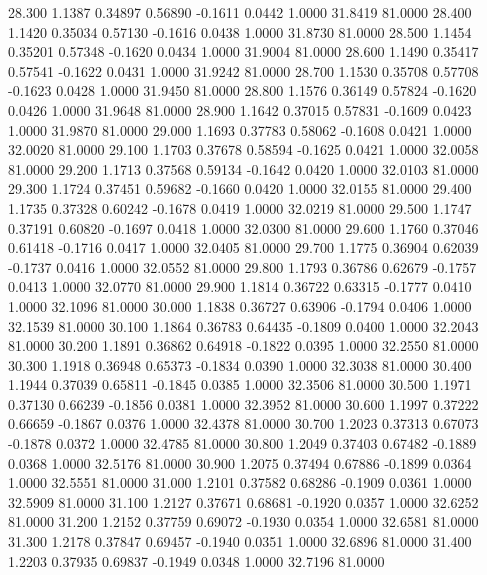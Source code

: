  28.300   1.1387   0.34897   0.56890  -0.1611   0.0442   1.0000  31.8419  81.0000
  28.400   1.1420   0.35034   0.57130  -0.1616   0.0438   1.0000  31.8730  81.0000
  28.500   1.1454   0.35201   0.57348  -0.1620   0.0434   1.0000  31.9004  81.0000
  28.600   1.1490   0.35417   0.57541  -0.1622   0.0431   1.0000  31.9242  81.0000
  28.700   1.1530   0.35708   0.57708  -0.1623   0.0428   1.0000  31.9450  81.0000
  28.800   1.1576   0.36149   0.57824  -0.1620   0.0426   1.0000  31.9648  81.0000
  28.900   1.1642   0.37015   0.57831  -0.1609   0.0423   1.0000  31.9870  81.0000
  29.000   1.1693   0.37783   0.58062  -0.1608   0.0421   1.0000  32.0020  81.0000
  29.100   1.1703   0.37678   0.58594  -0.1625   0.0421   1.0000  32.0058  81.0000
  29.200   1.1713   0.37568   0.59134  -0.1642   0.0420   1.0000  32.0103  81.0000
  29.300   1.1724   0.37451   0.59682  -0.1660   0.0420   1.0000  32.0155  81.0000
  29.400   1.1735   0.37328   0.60242  -0.1678   0.0419   1.0000  32.0219  81.0000
  29.500   1.1747   0.37191   0.60820  -0.1697   0.0418   1.0000  32.0300  81.0000
  29.600   1.1760   0.37046   0.61418  -0.1716   0.0417   1.0000  32.0405  81.0000
  29.700   1.1775   0.36904   0.62039  -0.1737   0.0416   1.0000  32.0552  81.0000
  29.800   1.1793   0.36786   0.62679  -0.1757   0.0413   1.0000  32.0770  81.0000
  29.900   1.1814   0.36722   0.63315  -0.1777   0.0410   1.0000  32.1096  81.0000
  30.000   1.1838   0.36727   0.63906  -0.1794   0.0406   1.0000  32.1539  81.0000
  30.100   1.1864   0.36783   0.64435  -0.1809   0.0400   1.0000  32.2043  81.0000
  30.200   1.1891   0.36862   0.64918  -0.1822   0.0395   1.0000  32.2550  81.0000
  30.300   1.1918   0.36948   0.65373  -0.1834   0.0390   1.0000  32.3038  81.0000
  30.400   1.1944   0.37039   0.65811  -0.1845   0.0385   1.0000  32.3506  81.0000
  30.500   1.1971   0.37130   0.66239  -0.1856   0.0381   1.0000  32.3952  81.0000
  30.600   1.1997   0.37222   0.66659  -0.1867   0.0376   1.0000  32.4378  81.0000
  30.700   1.2023   0.37313   0.67073  -0.1878   0.0372   1.0000  32.4785  81.0000
  30.800   1.2049   0.37403   0.67482  -0.1889   0.0368   1.0000  32.5176  81.0000
  30.900   1.2075   0.37494   0.67886  -0.1899   0.0364   1.0000  32.5551  81.0000
  31.000   1.2101   0.37582   0.68286  -0.1909   0.0361   1.0000  32.5909  81.0000
  31.100   1.2127   0.37671   0.68681  -0.1920   0.0357   1.0000  32.6252  81.0000
  31.200   1.2152   0.37759   0.69072  -0.1930   0.0354   1.0000  32.6581  81.0000
  31.300   1.2178   0.37847   0.69457  -0.1940   0.0351   1.0000  32.6896  81.0000
  31.400   1.2203   0.37935   0.69837  -0.1949   0.0348   1.0000  32.7196  81.0000
